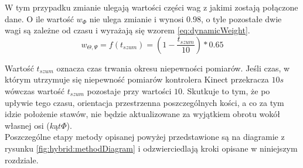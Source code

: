 W tym przypadku zmianie ulegają wartości części wag z jakimi zostają połączone dane. O ile wartość $w_\Phi$ nie ulega zmianie i wynosi $0.98$, o tyle pozostałe dwie wagi są zależne od czasu i wyrażają się wzorem \ref{eq:dynamicWeight}.
\begin{equation}
	w_{\Theta,\Psi} = f(t_{szum}) = (1-\frac{t_{szum}}{10}) * 0.65
	\label{eq:dynamicWeight}
\end{equation}

Wartość $t_{szum}$ oznacza czas trwania okresu niepewności pomiarów. Jeśli czas, w którym utrzymuje się niepewność pomiarów kontrolera Kinect przekracza $10s$ wówczas wartość $t_{szum}$ pozostaje przy wartości $10$. Skutkuje to tym, że po upływie tego czasu, orientacja przestrzenna poszczególnych kości, a co za tym idzie położenie stawów, nie będzie aktualizowane za wyjątkiem obrotu wokół własnej osi ($kąt \Phi$). \\


Poszczególne etapy metody opisanej powyżej przedstawione są na diagramie z rysunku \ref{fig:hybrid:methodDiagram} i odzwierciedlają kroki opisane w niniejszym rozdziale.